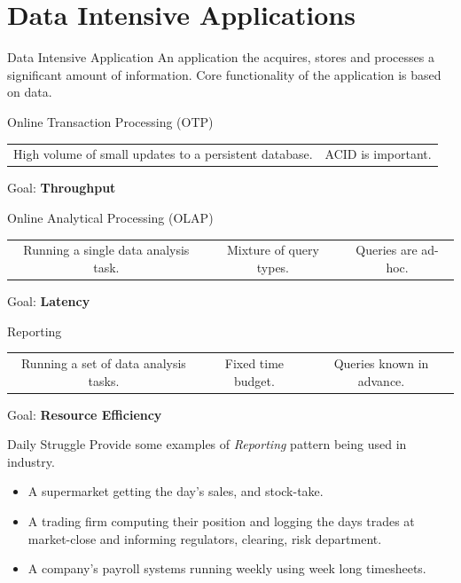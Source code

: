 \section{Data Intensive Applications}
\begin{definitionbox}{Data Intensive Application}
    An application the acquires, stores and processes a significant amount of information.
    Core functionality of the application is based on data.
\end{definitionbox}

\begin{definitionbox}{Online Transaction Processing (OTP)}
    \begin{center}
        \begin{tabular}{c c}
            High volume of small updates to a persistent database. & ACID is important. \\
        \end{tabular}
    \end{center}
    Goal: \textbf{Throughput}
\end{definitionbox}
\begin{definitionbox}{Online Analytical Processing (OLAP)}
    \begin{center}
        \begin{tabular}{c c c}
            Running a single data analysis task. & Mixture of query types. & Queries are ad-hoc. \\
        \end{tabular}
    \end{center}
    Goal: \textbf{Latency}
\end{definitionbox}
\begin{definitionbox}{Reporting}
    \begin{center}
        \begin{tabular}{c c c}
            Running a set of data analysis tasks. & Fixed time budget. & Queries known in advance. \\
        \end{tabular}
    \end{center}
    Goal: \textbf{Resource Efficiency}
\end{definitionbox}

\begin{examplebox}{Daily Struggle}
    Provide some examples of \textit{Reporting} pattern being used in industry.
    \tcblower
    \begin{itemize}
        \item A supermarket getting the day's sales, and stock-take.
        \item A trading firm computing their position and logging the days trades at market-close and informing regulators, clearing, risk department.
        \item A company's payroll systems running weekly using week long timesheets.
    \end{itemize}
\end{examplebox}


